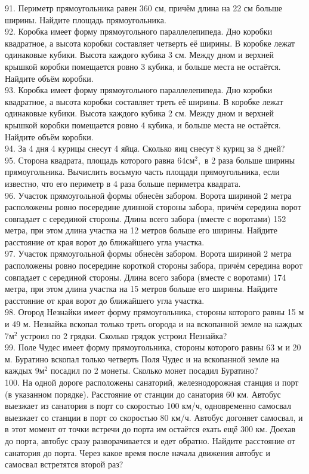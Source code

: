 91. Периметр прямоугольника равен 360 см, причём длина на 22 см больше ширины. Найдите площадь прямоугольника.\\
92. Коробка имеет форму прямоугольного параллелепипеда. Дно коробки квадратное, а высота коробки составляет четверть её ширины. В коробке лежат одинаковые кубики. Высота каждого кубика 3 см. Между дном и верхней крышкой коробки помещается ровно 3 кубика, и больше места не остаётся. Найдите объём коробки.\\
93. Коробка имеет форму прямоугольного параллелепипеда. Дно коробки квадратное, а высота коробки составляет треть её ширины. В коробке лежат одинаковые кубики. Высота каждого кубика 2 см. Между дном и верхней крышкой коробки помещается ровно 4 кубика, и больше места не остаётся. Найдите объём коробки.\\
94. За 4 дня 4 курицы снесут 4 яйца. Сколько яиц снесут 8 куриц за 8 дней?\\
95. Сторона квадрата, площадь которого равна $64\text{см}^2,$ в 2 раза больше ширины прямоугольника. Вычислить восьмую часть площади прямоугольника, если известно, что его периметр в 4 раза больше периметра квадрата.\\
96. Участок прямоугольной формы обнесён забором. Ворота шириной 2 метра расположены ровно посередине длинной стороны забора, причём середина ворот совпадает с серединой стороны. Длина всего забора (вместе с воротами) 152 метра, при этом длина участка на 12 метров больше его ширины. Найдите расстояние от края ворот до ближайшего угла участка.\\
97. Участок прямоугольной формы обнесён забором. Ворота шириной 2 метра расположены ровно посередине короткой стороны забора, причём середина ворот совпадает с серединой стороны. Длина всего забора (вместе с воротами) 174 метра, при этом длина участка на 15 метров больше его ширины. Найдите расстояние от края ворот до ближайшего угла участка.\\
98. Огород Незнайки имеет форму прямоугольника, стороны которого равны 15 м и 49 м. Незнайка вскопал только треть огорода и на вскопанной земле на каждых
$7\text{м}^2$ устроил по 2 грядки. Сколько грядок устроил Незнайка?\\
99. Поле Чудес имеет форму прямоугольника, стороны которого равны 63 м и 20 м. Буратино вскопал только четверть Поля Чудес и на вскопанной земле на каждых
$9\text{м}^2$ посадил по 2 монеты. Сколько монет посадил Буратино?\\
100. На одной дороге расположены санаторий, железнодорожная станция и порт (в указанном порядке). Расстояние от станции до санатория 60 км. Автобус выезжает из санатория в порт со скоростью 100 км/ч, одновременно самосвал выезжает со станции в порт со скоростью 80 км/ч. Автобус догоняет самосвал, и в этот момент от точки встречи до порта им остаётся ехать ещё 300 км. Доехав до порта, автобус сразу разворачивается и едет обратно. Найдите расстояние от санатория до порта. Через какое время после начала движения автобус и самосвал встретятся второй раз?\\

